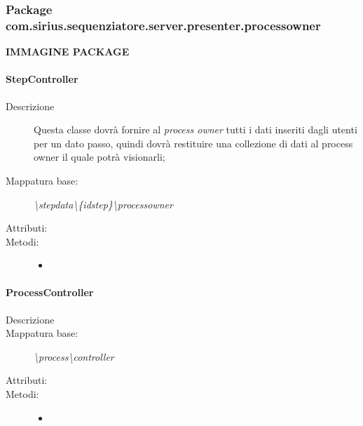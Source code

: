 \subsubsection{Package com.sirius.sequenziatore.server.presenter.processowner}
\textbf{IMMAGINE PACKAGE}
\paragraph{StepController}%
\begin{description}
	\item[Descrizione] Questa classe dovrà fornire al \textit{process owner} tutti i dati inseriti dagli utenti per un dato passo, quindi dovrà restituire una collezione di dati al process owner il quale potrà visionarli;
	\item[Mappatura base:] \textit{\textbackslash stepdata\textbackslash \{idstep\}\textbackslash processowner}
	\item[Attributi:]
	\item[Metodi:]\begin{itemize}
					\item 
				\end{itemize}
\end{description}
\paragraph{ProcessController}%
\begin{description}
	\item[Descrizione] 
	\item[Mappatura base:] \textit{\textbackslash process\textbackslash controller}
	\item[Attributi:]
	\item[Metodi:]\begin{itemize}
					\item 
				\end{itemize}
\end{description}
